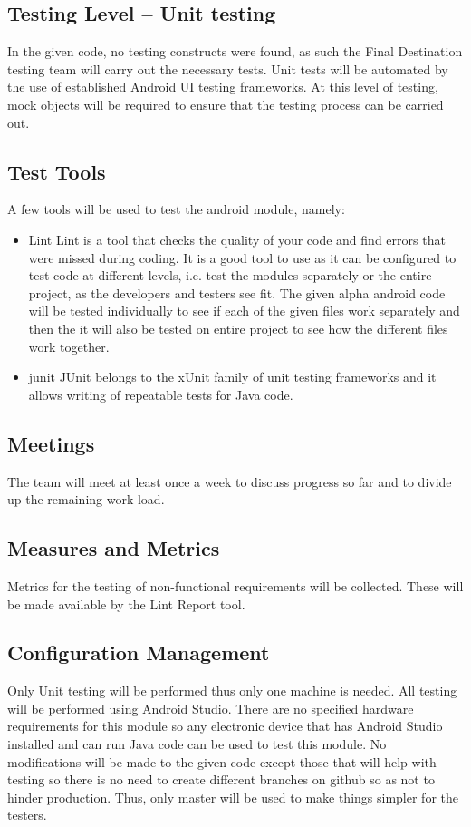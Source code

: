 \subsection{Testing Level -- Unit testing}
In the given code, no testing constructs were found, as such the Final Destination testing team will carry out the necessary tests.
Unit tests will be automated by the use of established Android UI testing frameworks. At this level of testing, mock objects will be required to ensure that the testing process can be carried out.

\subsection{Test Tools}
A few tools will be used to test the android module, namely: \\
\renewcommand{\labelenumi}{\Roman{enumi}}
\begin{itemize}
	\item Lint
	  Lint is a tool that checks the quality of your code and find errors that were missed during coding. It is a good tool to use as it can be configured to test code at different levels, i.e. test the modules separately or the entire project, as the developers and testers see fit. The given alpha android code will be tested individually to see if each of the given files work separately and then the it will also be tested on entire project to see how the different files work together.
	\item junit
	  JUnit belongs to the xUnit family of unit testing frameworks and it allows writing of repeatable tests for Java code.
\end{itemize}

\subsection{Meetings}
The team will meet at least once a week to discuss progress so far and to divide up the remaining work load.

\subsection{Measures and Metrics}
Metrics for the testing of non-functional requirements will be collected. These will be made available by the Lint Report tool.

\subsection{Configuration Management}
Only Unit testing will be performed thus only one machine is needed. All testing will be performed using Android Studio. There are no specified hardware requirements for this module so any electronic device that has Android Studio installed and can run Java code can be used to test this module.
No modifications will be made to the given code except those that will help with testing so there is no need to create different branches on github so as not to hinder production. Thus, only master will be used to make things simpler for the testers.

